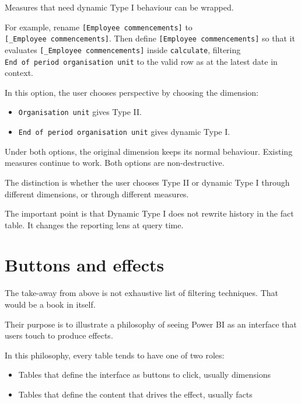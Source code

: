 \documentclass[10pt,openany,10pt]{book}
\providecommand{\tightlist}{%
  \setlength{\itemsep}{0pt}\setlength{\parskip}{0pt}}
\begin{document}
Measures that need dynamic Type I behaviour can be wrapped.

For example, rename \texttt{{[}Employee\ commencements{]}} to
\texttt{{[}\_Employee\ commencements{]}}. Then define
\texttt{{[}Employee\ commencements{]}} so that it evaluates
\texttt{{[}\_Employee\ commencements{]}} inside \texttt{calculate},
filtering
\texttt{\textquotesingle{}End\ of\ period\ organisation\ unit\textquotesingle{}}
to the valid row as at the latest date in context.

In this option, the user chooses perspective by choosing the dimension:

\begin{itemize}
\tightlist
\item
  \texttt{\textquotesingle{}Organisation\ unit\textquotesingle{}} gives
  Type II.
\item
  \texttt{\textquotesingle{}End\ of\ period\ organisation\ unit\textquotesingle{}}
  gives dynamic Type I.
\end{itemize}

Under both options, the original dimension keeps its normal behaviour.
Existing measures continue to work. Both options are non-destructive.

The distinction is whether the user chooses Type II or dynamic Type I
through different dimensions, or through different measures.

The important point is that Dynamic Type I does not rewrite history in
the fact table. It changes the reporting lens at query time.

\section{Buttons and effects}\label{buttons-and-effects}

The take-away from above is not exhaustive list of filtering techniques.
That would be a book in itself.

Their purpose is to illustrate a philosophy of seeing Power BI as an
interface that users touch to produce effects.

In this philosophy, every table tends to have one of two roles:

\begin{itemize}
\tightlist
\item
  Tables that define the interface as buttons to click, usually
  dimensions
\item
  Tables that define the content that drives the effect, usually facts
\end{itemize}
\end{document}
